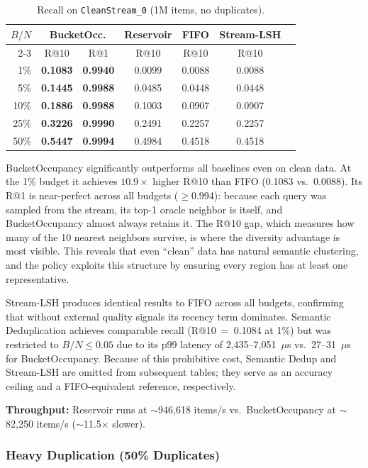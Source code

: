 \documentclass[conference]{IEEEtran}
\begin{document}
\begin{table}[h]
\centering
\caption{Recall on \texttt{CleanStream\_0} (1M items, no duplicates).}
\label{tab:clean}
\begin{tabular}{@{}rcccccc@{}}
\toprule
$B/N$ & \multicolumn{2}{c}{BucketOcc.} & Reservoir & FIFO & Stream-LSH \\
\cmidrule(lr){2-3}
      & R@10 & R@1 & R@10 & R@10 & R@10 \\
\midrule
 1\% & \textbf{0.1083} & \textbf{0.9940} & 0.0099 & 0.0088 & 0.0088 \\
 5\% & \textbf{0.1445} & \textbf{0.9988} & 0.0485 & 0.0448 & 0.0448 \\
10\% & \textbf{0.1886} & \textbf{0.9988} & 0.1003 & 0.0907 & 0.0907 \\
25\% & \textbf{0.3226} & \textbf{0.9990} & 0.2491 & 0.2257 & 0.2257 \\
50\% & \textbf{0.5447} & \textbf{0.9994} & 0.4984 & 0.4518 & 0.4518 \\
\bottomrule
\end{tabular}
\end{table}

BucketOccupancy significantly outperforms all baselines even on clean
data. At the 1\% budget it achieves $10.9\times$ higher R@10 than FIFO
(0.1083 vs.\ 0.0088). Its R@1 is near-perfect across all budgets
($\ge$0.994): because each query was sampled from the stream, its
top-1 oracle neighbor is itself, and BucketOccupancy almost always
retains it. The R@10 gap, which measures how many of the 10 nearest
neighbors survive, is where the diversity advantage is most visible.
This reveals that even ``clean'' data has natural semantic clustering,
and the policy exploits this structure by ensuring every region has at
least one representative.

Stream-LSH produces identical results to FIFO across all budgets,
confirming that without external quality signals its recency term
dominates. Semantic Deduplication achieves comparable recall
(R@10~=~0.1084 at 1\%) but was restricted to $B/N \le 0.05$ due to
its p99 latency of 2,435--7,051~$\mu$s vs.\ 27--31~$\mu$s for
BucketOccupancy. Because of this prohibitive cost, Semantic Dedup and
Stream-LSH are omitted from subsequent tables; they serve as an
accuracy ceiling and a FIFO-equivalent reference, respectively.

\textbf{Throughput:} Reservoir runs at $\sim$946,618 items/s vs.\
BucketOccupancy at $\sim$82,250 items/s ($\sim$11.5$\times$ slower).

\subsubsection{Heavy Duplication (50\% Duplicates)}
\end{document}
